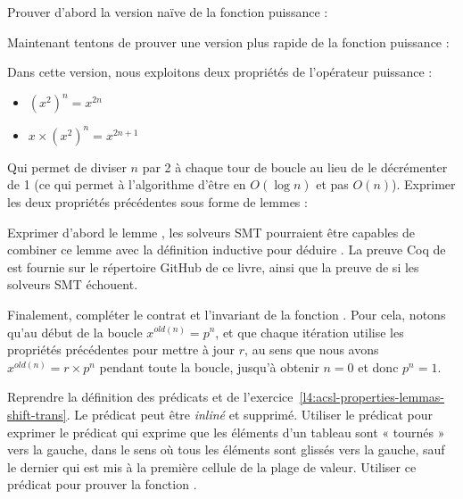 Prouver d'abord la version naïve de la fonction puissance :




Maintenant tentons de prouver une version plus rapide de la fonction puissance :




Dans cette version, nous exploitons deux propriétés de l'opérateur puissance :


\begin{itemize}
\item $(x^2)^n = x^{2n}$
\item $x \times (x^2)^n = x^{2n+1}$
\end{itemize}


Qui permet de diviser $n$ par 2 à chaque tour de boucle au lieu de le décrémenter
de 1 (ce qui permet à l'algorithme d'être en $O(\log n)$ et pas $O(n)$). Exprimer
les deux propriétés précédentes sous forme de lemmes :




Exprimer d'abord le lemme , les solveurs SMT pourraient
être capables de combiner ce lemme avec la définition inductive pour déduire
. La preuve Coq de  est fournie
sur le répertoire GitHub de ce livre, ainsi que la preuve de 
si les solveurs SMT échouent.


Finalement, compléter le contrat et l'invariant de la fonction .
Pour cela, notons qu'au début de la boucle $x^{old(n)} = p^n$, et que chaque itération
utilise les propriétés précédentes pour mettre à jour $r$, au sens que nous avons
$x^{old(n)} = r \times p^n$ pendant toute la boucle, jusqu'à obtenir $n = 0$ et donc
$p ^n = 1$.






Reprendre la définition des prédicats  et 
de l'exercice~\ref{l4:acsl-properties-lemmas-shift-trans}. Le prédicat
 peut être \textit{inliné} et supprimé. Utiliser le prédicat
 pour exprimer le prédicat  qui exprime que
les éléments d'un tableau sont « tournés » vers la gauche, dans le sens où tous les
éléments sont glissés vers la gauche, sauf le dernier qui est mis à la première
cellule de la plage de valeur. Utiliser ce prédicat pour prouver la fonction
.



